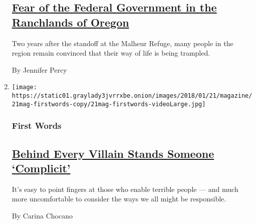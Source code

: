 \begin{enumerate}
  \hypertarget{fear-of-the-federal-government-in-the-ranchlands-of-oregon}{%
  \subsection{\texorpdfstring{\href{/2018/01/18/magazine/fear-of-the-federal-government-in-the-ranchlands-of-oregon.html}{Fear
  of the Federal Government in the Ranchlands of
  Oregon}}{Fear of the Federal Government in the Ranchlands of Oregon}}\label{fear-of-the-federal-government-in-the-ranchlands-of-oregon}}

  Two years after the standoff at the Malheur Refuge, many people in the
  region remain convinced that their way of life is being trampled.

  By Jennifer Percy
\item
  \texttt{[image: https://static01.graylady3jvrrxbe.onion/images/2018/01/21/magazine/21mag-firstwords-copy/21mag-firstwords-videoLarge.jpg]}

  \hypertarget{first-words}{%
  \subsubsection{First Words}\label{first-words}}

  \hypertarget{behind-every-villain-stands-someone-complicit}{%
  \subsection{\texorpdfstring{\href{/2018/01/17/magazine/behind-every-villain-stands-someone-complicit.html}{Behind
  Every Villain Stands Someone
  `Complicit'}}{Behind Every Villain Stands Someone `Complicit'}}\label{behind-every-villain-stands-someone-complicit}}

  It's easy to point fingers at those who enable terrible people --- and
  much more uncomfortable to consider the ways we all might be
  responsible.

  By Carina Chocano
\end{enumerate}

